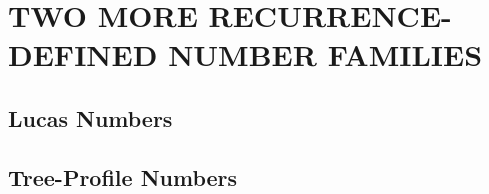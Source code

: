 
\chapter{TWO MORE RECURRENCE-DEFINED NUMBER FAMILIES}

\section{Lucas Numbers}
\label{sec:Lucas-numbers}




\section{Tree-Profile Numbers}
\label{sec:Tree-Profile-numbers}


